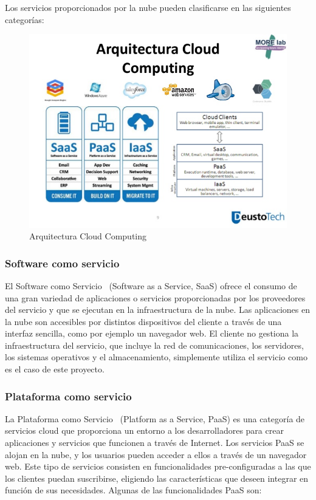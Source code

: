 \documentclass[a4paper,11pt]{book}
\begin{document}
Los servicios proporcionados por la nube pueden clasificarse en las siguientes categorías:

\begin{figure}[H]
\centering
\includegraphics[scale=0.5]{imagenes/arquitecturaCC.jpg}
\caption{ Arquitectura Cloud Computing~\cite{arquitecturaCC} }
\end{figure}

\subsubsection{Software como servicio}\label{secsaas}

El Software como Servicio~\cite{saas} (Software as a Service, SaaS) ofrece el consumo de una gran variedad de aplicaciones o servicios proporcionadas por los proveedores del servicio y que se ejecutan en la infraestructura de la nube. Las aplicaciones en la nube son accesibles por distintos dispositivos del cliente a través de una interfaz sencilla, como por ejemplo un navegador web. El cliente no gestiona la infraestructura del servicio, que incluye la red de comunicaciones, los servidores, los sistemas operativos y el almacenamiento, simplemente utiliza el servicio como es el caso de este proyecto.

\subsubsection{Plataforma como servicio}\label{secpaas}

La Plataforma como Servicio~\cite{paas} (Platform as a Service, PaaS) es una categoría de servicios cloud que proporciona un entorno a los desarrolladores para crear aplicaciones y servicios que funcionen a través de Internet. Los servicios PaaS se alojan en la nube, y los usuarios pueden acceder a ellos a través de un navegador web. Este tipo de servicios consisten en funcionalidades pre-configuradas a las que los clientes puedan suscribirse, eligiendo las características que deseen integrar en función de sus necesidades. Algunas de las funcionalidades PaaS son:
\end{document}
